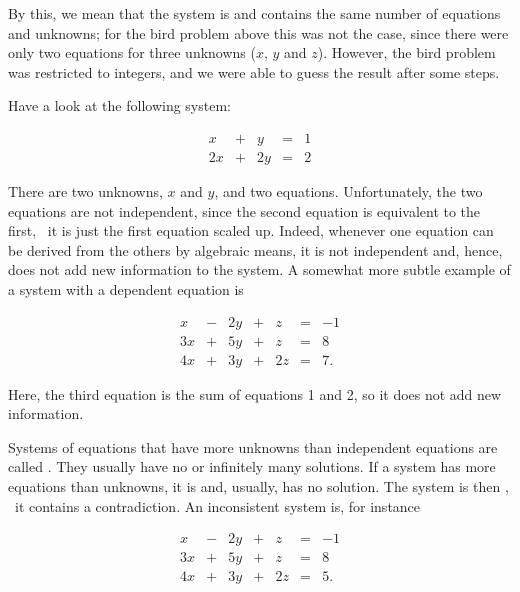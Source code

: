 \documentclass[tikz]{scrreprt}
\begin{document}
By this, we mean that the system
is  and contains the same number of 
 equations
and unknowns; for the bird problem above this was
not the case, since there were only two equations
for three unknowns ($x$, $y$ and $z$). 
However, the bird problem was restricted to integers,
and we were able to guess the result after some steps. 

Have a look at the following system: 

\begin{equation}
\begin{array}{rcrcr}
 x & + &  y & = & 1\\
2x & + & 2y & = & 2
\end{array}
\end{equation}

There are two unknowns, $x$ and $y$, and two equations.
Unfortunately, the two equations are not independent,
since the second equation is equivalent to the first,
\ie\ it is just the first equation scaled up.
Indeed, whenever one equation can be derived from the others
by algebraic means, it is not independent and, hence,
does not add new information to the system.
A somewhat more subtle example of a system 
with a dependent equation is

\begin{equation}\label{eq_linEqUnder}
\begin{array}{rcrcrcr}
 x & - & 2y & + &  z & = & -1\\
3x & + & 5y & + &  z & = &  8\\
4x & + & 3y & + & 2z & = &  7.
\end{array}
\end{equation}

Here, the third equation is the sum of equations 1 and 2,
so it does not add new information.

Systems of equations that have more unknowns than
independent equations are called .
They usually have no or infinitely many solutions.
If a system has more equations than unknowns, it is
 and, usually, has no solution.
The system is then , \ie\ it contains a
contradiction. An inconsistent system is, for instance

\begin{equation}
\begin{array}{rcrcrcr}
 x & - & 2y & + &  z & = & -1\\
3x & + & 5y & + &  z & = &  8\\
4x & + & 3y & + & 2z & = &  5.
\end{array}
\end{equation}
\end{document}
